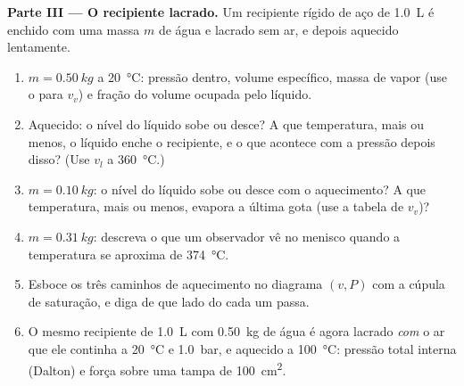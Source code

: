 \begin{problem}
\medskip
\noindent\textbf{Parte III --- O recipiente lacrado.}
Um recipiente rígido de aço de \qty{1.0}{L} é enchido com uma massa $m$ de água
e lacrado sem ar, e depois aquecido lentamente.
\begin{enumerate}[resume]
  \item $m = \qty{0.50}{kg}$ a \qty{20}{\degreeCelsius}: pressão dentro,
        volume específico, massa de vapor (use o  para $v_v$)
        e fração do volume ocupada pelo líquido.
  \item Aquecido: o nível do líquido sobe ou desce? A que temperatura,
        mais ou menos, o líquido enche o recipiente, e o que acontece com
        a pressão depois disso? (Use $v_l$ a \qty{360}{\degreeCelsius}.)
  \item $m = \qty{0.10}{kg}$: o nível do líquido sobe ou desce com o
        aquecimento? A que temperatura, mais ou menos, evapora a última
        gota (use a tabela de $v_v$)?
  \item $m = \qty{0.31}{kg}$: descreva o que um observador vê no
        menisco quando a temperatura se aproxima de \qty{374}{\degreeCelsius}.
  \item Esboce os três caminhos de aquecimento no diagrama $(v, P)$ com a
        cúpula de saturação, e diga de que lado do  cada um
        passa.
  \item O mesmo recipiente de \qty{1.0}{L} com \qty{0.50}{kg} de água é agora
        lacrado \emph{com} o ar que ele continha a \qty{20}{\degreeCelsius} e
        \qty{1.0}{bar}, e aquecido a \qty{100}{\degreeCelsius}: pressão total
        interna (Dalton) e força sobre uma tampa de \qty{100}{cm^2}.
\end{enumerate}


\end{problem}
